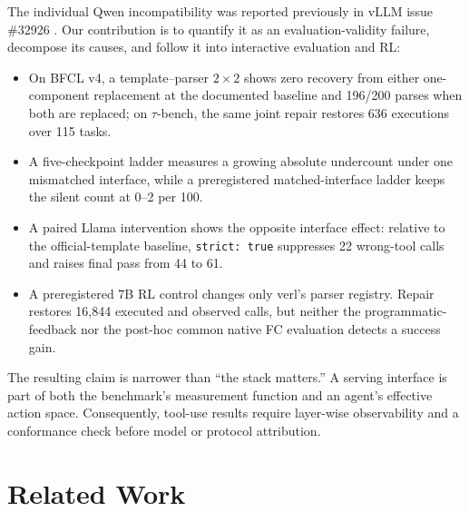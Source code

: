 The individual Qwen incompatibility was reported previously in vLLM issue \#32926
\citep{vllm_issue_32926}. Our contribution is to quantify it as an evaluation-validity failure,
decompose its causes, and follow it into interactive evaluation and RL:
\begin{itemize}
\setlength{\itemsep}{1pt}
\item On BFCL v4, a template--parser $2\times2$ shows zero recovery from either one-component
replacement at the documented baseline and 196/200 parses when both are replaced; on
$\tau$-bench, the same joint repair restores 636 executions over 115 tasks.
\item A five-checkpoint ladder measures a growing absolute undercount under one mismatched
interface, while a preregistered matched-interface ladder keeps the silent count at 0--2 per 100.
\item A paired Llama intervention shows the opposite interface effect: relative to the
official-template baseline, \texttt{strict: true} suppresses 22 wrong-tool calls and raises final
pass from 44 to 61.
\item A preregistered 7B RL control changes only verl's parser registry. Repair restores 16,844
executed and observed calls, but neither the programmatic-feedback nor the post-hoc common native FC evaluation detects a success gain.
\end{itemize}

The resulting claim is narrower than ``the stack matters.'' A serving interface is part of both
the benchmark's measurement function and an agent's effective action space. Consequently,
tool-use results require layer-wise observability and a conformance check before model or protocol
attribution.

\section{Related Work}
\label{sec:related}

